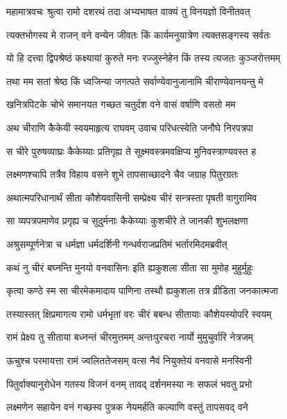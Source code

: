 
\twolineshloka
{महामात्रवचः श्रुत्वा रामो दशरथं तदा}
{अभ्यभाषत वाक्यं तु विनयज्ञो विनीतवत्} %

\twolineshloka
{त्यक्तभोगस्य मे राजन् वने वन्येन जीवतः}
{किं कार्यमनुयात्रेण त्यक्तसङ्गस्य सर्वतः} %

\twolineshloka
{यो हि दत्त्वा द्विपश्रेष्ठं कक्ष्यायां कुरुते मनः}
{रज्जुस्नेहेन किं तस्य त्यजतः कुञ्जरोत्तमम्} %

\twolineshloka
{तथा मम सतां श्रेष्ठ किं ध्वजिन्या जगत्पते}
{सर्वाण्येवानुजानामि चीराण्येवानयन्तु मे} %

\twolineshloka
{खनित्रपिटके चोभे समानयत गच्छत}
{चतुर्दश वने वासं वर्षाणि वसतो मम} %

\twolineshloka
{अथ चीराणि कैकेयी स्वयमाहृत्य राघवम्}
{उवाच परिधत्स्वेति जनौघे निरपत्रपा} %

\twolineshloka
{स चीरे पुरुषव्याघ्रः कैकेय्याः प्रतिगृह्य ते}
{सूक्ष्मवस्त्रमवक्षिप्य मुनिवस्त्राण्यवस्त ह} %

\twolineshloka
{लक्ष्मणश्चापि तत्रैव विहाय वसने शुभे}
{तापसाच्छादने चैव जग्राह पितुरग्रतः} %

\twolineshloka
{अथात्मपरिधानार्थं सीता कौशेयवासिनी}
{सम्प्रेक्ष्य चीरं सन्त्रस्ता पृषती वागुरामिव} %

\twolineshloka
{सा व्यपत्रपमाणेव प्रगृह्य च सुदुर्मनाः}
{कैकेय्याः कुशचीरे ते जानकी शुभलक्षणा} %

\twolineshloka
{अश्रुसम्पूर्णनेत्रा च धर्मज्ञा धर्मदर्शिनी}
{गन्धर्वराजप्रतिमं भर्तारमिदमब्रवीत्} %

\twolineshloka
{कथं नु चीरं बघ्नन्ति मुनयो वनवासिनः}
{इति ह्यकुशला सीता सा मुमोह मुहुर्मुहुः} %

\twolineshloka
{कृत्वा कण्ठे स्म सा चीरमेकमादाय पाणिना}
{तस्थौ ह्यकुशला तत्र व्रीडिता जनकात्मजा} %

\twolineshloka
{तस्यास्तत् क्षिप्रमागत्य रामो धर्मभृतां वरः}
{चीरं बबन्ध सीतायाः कौशेयस्योपरि स्वयम्} %

\twolineshloka
{रामं प्रेक्ष्य तु सीताया बध्नन्तं चीरमुत्तमम्}
{अन्तःपुरचरा नार्यो मुमुचुर्वारि नेत्रजम्} %

\twolineshloka
{ऊचुश्च परमायत्ता रामं ज्वलिततेजसम्}
{वत्स नैवं नियुक्तेयं वनवासे मनस्विनी} %

\twolineshloka
{पितुर्वाक्यानुरोधेन गतस्य विजनं वनम्}
{तावद् दर्शनमस्या नः सफलं भवतु प्रभो} %

\twolineshloka
{लक्ष्मणेन सहायेन वनं गच्छस्व पुत्रक}
{नेयमर्हति कल्याणि वस्तुं तापसवद् वने} %

